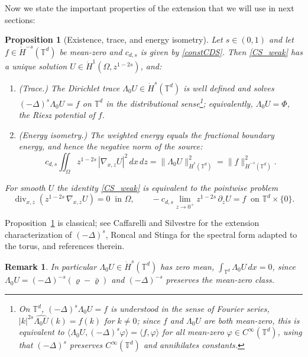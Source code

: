 \documentclass[12pt,a4paper,twoside]{article}
\newcommand{\Div}{\operatorname{div}}
\newcommand{\vr}{\varrho}
\newcommand{\Grad}{\nabla}
\newtheorem{prop}[thm]{Proposition}
\newtheorem{rmk}{Remark}
\numberwithin{equation}{section}%
\begin{document}
	Now we state the important properties of the extension that we will use in next sections: 
	\begin{prop}[Existence, trace, and energy isometry]\label{prop:CS_weak}
		Let $s\in(0,1)$ and let $f\in\dot H^{-s}(\mathbb T^d)$ be mean-zero and $c_{d,s}$ is given by \eqref{constCDS}. Then \eqref{CS_weak} has a unique solution $U\in\dot H^1(\Omega,z^{1-2s})$, and:
		\begin{enumerate}[leftmargin=*]
			\item \textup{(Trace.)} The Dirichlet trace $\Lambda_0 U\in\dot H^s(\mathbb T^d)$ is well defined and solves $(-\Delta)^s\Lambda_0 U=f$ on $\mathbb T^d$ in the distributional sense\footnote{On $\mathbb T^d$, $(-\Delta)^s\Lambda_0 U=f$ is understood in the sense of Fourier series, $|k|^{2s}\widehat{\Lambda_0 U}(k)=\hat f(k)$ for $k\neq0$; since $f$ and $\Lambda_0 U$ are both mean-zero, this is equivalent to $\langle\Lambda_0 U,(-\Delta)^s\varphi\rangle=\langle f,\varphi\rangle$ for all mean-zero $\varphi\in C^\infty(\mathbb T^d)$, using that $(-\Delta)^s$ preserves $C^\infty(\mathbb T^d)$ and annihilates constants.}; equivalently, $\Lambda_0 U=\Phi$, the Riesz potential of $f$.
			\item \textup{(Energy isometry.)} The weighted energy equals the fractional boundary energy, and hence the negative norm of the source:
			\begin{equation}\label{CS-prop1}
				c_{d,s}\iint_{\Omega} z^{1-2s}\,|\Grad_{x,z} U|^2\,dx\,dz
				= \|\Lambda_0 U\|_{\dot H^s(\mathbb T^d)}^2
				= \|f\|_{\dot H^{-s}(\mathbb T^d)}^2 .
			\end{equation}
		\end{enumerate}
		For smooth $U$ the identity \eqref{CS_weak} is equivalent to the pointwise problem
		\[
		\Div_{x,z}\!\left(z^{1-2s}\,\Grad_{x,z} U\right)=0\ \text{ in }\Omega,
		\qquad
		-c_{d,s}\lim_{z\to0^+} z^{1-2s}\,\partial_z U=f\ \text{ on }\mathbb T^d\times\{0\}.
		\]
	
	\end{prop}
	Proposition~\ref{prop:CS_weak} is classical; see Caffarelli and Silvestre \cite{CaS2007} for the extension characterization of $(-\Delta)^s$, Roncal and Stinga \cite{RS2016} for the spectral form adapted to the torus, and references therein. 	
\begin{rmk}\label{rem:trace-mean-zero}
	In particular $\Lambda_0 U\in\dot H^s(\mathbb T^d)$ has zero mean,
	$\int_{\mathbb T^d}\Lambda_0 U\,dx=0$, since $\Lambda_0 U=(-\Delta)^{-s}(\vr-\bar\vr)$ and
	$(-\Delta)^{-s}$ preserves the mean-zero class.
\end{rmk}
\end{document}
